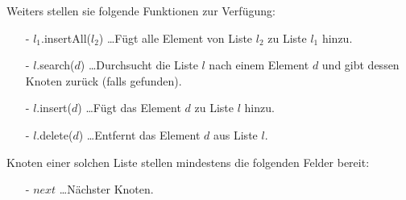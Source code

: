 \documentclass{article}
\begin{document}
\noindent
Weiters stellen sie folgende Funktionen zur Verf{\"u}gung:
\begin{itemize}

  \item[-] $l_1$.insertAll($l_2$) \ldots F{\"u}gt alle Element von Liste $l_2$ zu
    Liste $l_1$ hinzu.
  \item[-] $l$.search($d$) \ldots Durchsucht die Liste $l$ nach einem Element $d$
    und gibt dessen Knoten zur{\"u}ck (falls gefunden).
  \item[-] $l$.insert($d$) \ldots F{\"u}gt das Element $d$ zu Liste $l$ hinzu.
  \item[-] $l$.delete($d$) \ldots Entfernt das Element $d$ aus Liste $l$.
\end{itemize}
%
Knoten einer solchen Liste stellen mindestens die folgenden Felder bereit:
\begin{itemize}
  \item[-] $next$ \ldots N{\"a}chster Knoten.
\end{itemize}
%
\end{document}

